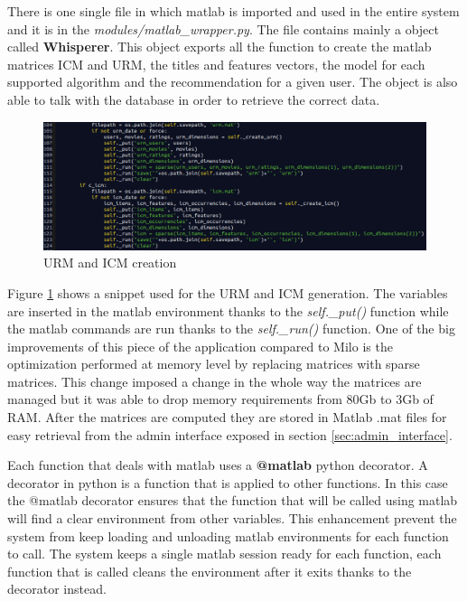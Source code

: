 There is one single file in which matlab is imported and used in the entire system and it is in the \textit{modules/matlab\_wrapper.py}. The file contains mainly a object called \textbf{Whisperer}. This object exports all the function to create the matlab matrices \ac{ICM} and \ac{URM}, the titles and features vectors, the model for each supported algorithm and the recommendation for a given user. The object is also able to talk with the database in order to retrieve the correct data.

\begin{figure}
  \centering
  \includegraphics[width=\textwidth]{figures/urm_and_icm_creation.png}
  \caption{URM and ICM creation}
  \label{fig:urm_and_icm_cration}
\end{figure}

Figure \ref{fig:urm_and_icm_cration} shows a snippet used for the \ac{URM} and \ac{ICM} generation. The variables are inserted in the matlab environment thanks to the \textit{self.\_put()} function while the matlab commands are run thanks to the \textit{self.\_run()} function. One of the big improvements of this piece of the application compared to Milo is the optimization performed at memory level by replacing matrices with sparse matrices. This change imposed a change in the whole way the matrices are managed but it was able to drop memory requirements from 80Gb to 3Gb of \ac{RAM}. After the matrices are computed they are stored in Matlab .mat files for easy retrieval from the admin interface exposed in section \ref{sec:admin_interface}.

Each function that deals with matlab uses a \textbf{@matlab} python decorator. A decorator in python is a function that is applied to other functions. In this case the @matlab decorator ensures that the function that will be called using matlab will find a clear environment from other variables. This enhancement prevent the system from keep loading and unloading matlab environments for each function to call. The system keeps a single matlab session ready for each function, each function that is called cleans the environment after it exits thanks to the decorator instead.

